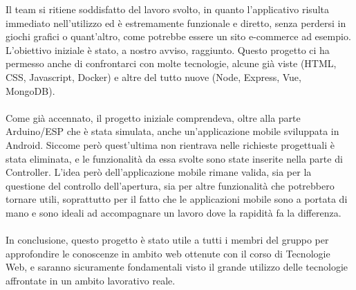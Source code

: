\documentclass[a4paper,12pt]{report}
\begin{document}
Il team si ritiene soddisfatto del lavoro svolto, in quanto l'applicativo risulta immediato nell'utilizzo ed è estremamente funzionale e diretto, senza perdersi in giochi grafici o quant'altro, come potrebbe essere un sito e-commerce ad esempio. L'obiettivo iniziale è stato, a nostro avviso, raggiunto. Questo progetto ci ha permesso anche di confrontarci con molte tecnologie, alcune già viste (HTML, CSS, Javascript, Docker) e altre del tutto nuove (Node, Express, Vue, MongoDB).\\\\
Come già accennato, il progetto iniziale comprendeva, oltre alla parte Arduino/ESP che è stata simulata, anche un'applicazione mobile sviluppata in Android. Siccome però quest'ultima non rientrava nelle richieste progettuali è stata eliminata, e le funzionalità da essa svolte sono state inserite nella parte di Controller. L'idea però dell'applicazione mobile rimane valida, sia per la questione del controllo dell'apertura, sia per altre funzionalità che potrebbero tornare utili, soprattutto per il fatto che le applicazioni mobile sono a portata di mano e sono ideali ad accompagnare un lavoro dove la rapidità fa la differenza.\\\\
In conclusione, questo progetto è stato utile a tutti i membri del gruppo per approfondire le conoscenze in ambito web ottenute con il corso di Tecnologie Web, e saranno sicuramente fondamentali visto il grande utilizzo delle tecnologie affrontate in un ambito lavorativo reale.
\end{document}
